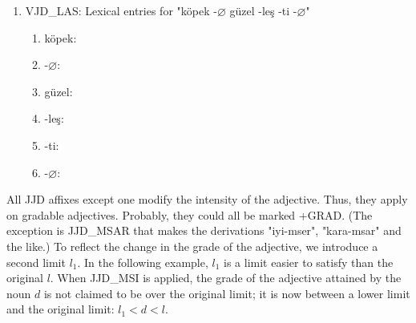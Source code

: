 \documentclass[11pt]{article} %
\begin{document}
\begin{enumerate}[resume*]
	\item VJD\_LAS: Lexical entries for "köpek -$\varnothing$ güzel -leş -ti -$\varnothing$"
	\begin{enumerate}[label=(\alph*), ref=(\alph*)]\itemsep1pt
	\item köpek: 
	\item -$\varnothing$: 
	\item güzel: 
	\item -leş: %
	\item -ti: 
	\item -$\varnothing$: 
	\end{enumerate}
\end{enumerate}

All JJD affixes except one modify the intensity of the adjective. Thus, they apply on gradable adjectives. Probably, they could all be marked +GRAD. (The exception is JJD\_MSAR that makes the derivations "iyi-mser", "kara-msar" and the like.) To reflect the change in the grade of the adjective, we introduce a second limit $l_1$. In the following example, $l_1$ is a limit easier to satisfy than the original $l$. When JJD\_MSI is applied, the grade of the adjective attained by the noun $d$ is not claimed to be over the original limit; it is now between a lower limit and the original limit: $l_1<d<l$.
\end{document}
